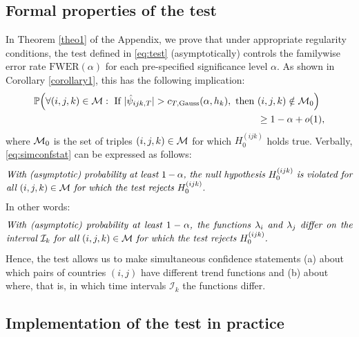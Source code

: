\documentclass[a4paper,12pt]{article}
\numberwithin{equation}{section}
\begin{document}
\subsection{Formal properties of the test}\label{subsec:test:properties}


In Theorem \ref{theo1} of the Appendix, we prove that under appropriate regularity conditions, the test defined in \eqref{eq:test} (asymptotically) controls the familywise error rate $\text{FWER}(\alpha)$ for each pre-specified significance level $\alpha$. As shown in Corollary \ref{corollary1}, this has the following implication: 
\begin{align}
\mathbb{P}\Big( \forall (i,j,k) \in \mathcal{M}: \text{ If } |\hat{\psi}_{ijk,T}| > c_{T,\textnormal{Gauss}}(\alpha,h_k), \text{ then } & (i,j,k) \notin \mathcal{M}_0 \Big) \nonumber \\ & \ge 1 - \alpha + o(1), \label{eq:simconfstat}
\end{align} 
where $\mathcal{M}_0$ is the set of triples $(i,j,k) \in \mathcal{M}$ for which $H_0^{(ijk)}$ holds true. Verbally, \eqref{eq:simconfstat} can be expressed as follows:  
\begin{equation}\label{eq:confidencestatement1}
\begin{minipage}[c][1cm][c]{13cm}
\textit{With (asymptotic) probability at least $1-\alpha$, the null hypothesis $H_0^{(ijk)}$ is violated for all $(i,j,k) \in \indexset$ for which the test rejects $H_0^{(ijk)}$.} 
\end{minipage}
\end{equation}
In other words: 
\begin{equation}\label{eq:confidencestatement2}
\begin{minipage}[c][1cm][c]{13cm}
\textit{With (asymptotic) probability at least $1-\alpha$, the functions $\lambda_i$ and $\lambda_j$ differ on the interval $\mathcal{I}_k$ for all $(i,j,k) \in \indexset$ for which the test rejects $H_0^{(ijk)}$.} 
\end{minipage}
\end{equation}
Hence, the test allows us to make simultaneous confidence statements (a) about which pairs of countries $(i,j)$ have different trend functions and (b) about where, that is, in which time intervals $\mathcal{I}_k$ the functions differ.


\subsection{Implementation of the test in practice}
\end{document}
